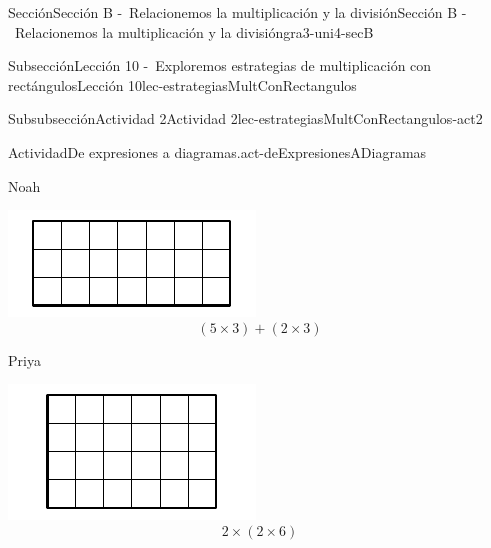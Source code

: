 \begin{sectionptx}{Sección}{Sección B -~Relacionemos la multiplicación y la división}{}{Sección B -~Relacionemos la multiplicación y la división}{}{}{gra3-uni4-secB}
\begin{subsectionptx}{Subsección}{Lección 10 -~Exploremos estrategias de multiplicación con rectángulos}{}{Lección 10}{}{}{lec-estrategiasMultConRectangulos}
\typeout{************************************************}
%
\begin{subsubsectionptx}{Subsubsección}{Actividad 2}{}{Actividad 2}{}{}{lec-estrategiasMultConRectangulos-act2}
\begin{activity}{Actividad}{De expresiones a diagramas.}{act-deExpresionesADiagramas}%
\begin{sidebyside}{3}{0.0166666666666667}{0.0166666666666667}{0.0333333333333333}%
\begin{sbspanel}{0.3}%
Noah%
\par
\includegraphics[max width=\linewidth, center]{external/svg-source/tikz-file-153051.pdf}
%
\begin{equation*}
(5\times 3)+(2 \times 3)
\end{equation*}
%
\end{sbspanel}%
\begin{sbspanel}{0.3}%
Priya%
\par
\includegraphics[max width=\linewidth, center]{external/svg-source/tikz-file-153053.pdf}
%
\begin{equation*}
2 \times (2 \times 6)
\end{equation*}
%
\end{sbspanel}%
\begin{sbspanel}{0.3}%

\end{sbspanel}
\end{sidebyside}
\end{activity}
\end{subsubsectionptx}
\end{subsectionptx}
\end{sectionptx}
